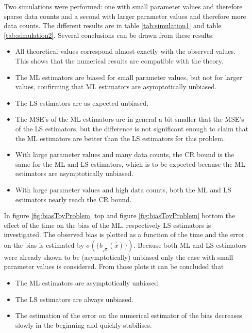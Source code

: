\documentclass[report,12pt]{report}
\begin{document}
Two simulations were performed: one with small parameter values and therefore sparse data counts and a second with larger parameter values and therefore more data counts. The different results are in table \ref{tab:simulation1} and table \ref{tab:simulation2}. Several conclusions can be drawn from these results:
\begin{itemize}
	\item All theoretical values correspond almost exactly with the observed values. This shows that the numerical results are compatible with the theory.
	
	\item The ML estimators are biased for small parameter values, but not for larger values, confirming that ML estimators are asymptotically unbiased.
	
	\item The LS estimators are as expected unbiased.
		
	\item The MSE's of the ML estimators are in general a bit smaller that the MSE's of the LS estimators, but the difference is not significant enough to claim that the ML estimators are better than the LS estimators for this problem.

	\item With large parameter values and many data counts, the CR bound is the same for the ML and LS estimators, which is to be expected because the ML estimators are asymptotically unbiased.
		
	\item With large parameter values and high data counts, both the ML and LS estimators nearly reach the CR bound.
\end{itemize}

In figure \ref{fig:biasToyProblem} top and figure \ref{fig:biasToyProblem}  bottom the effect of the time on the bias of the ML, respectively LS estimators is investigated. The observed bias is plotted as a function of the time and the error on the bias is estimated by $\sigma(\{b_{_{\sqrt{k}}}(\hat x)\})$. Because both ML and LS estimators were already shown to be (asymptotically) unbiased only the case with small parameter values is considered. From those plots it can be concluded that 
\begin{itemize}
	\item The ML estimators are asymptotically unbiased.
	
	\item The LS estimators are always unbiased.
	
	\item The estimation of the error on the numerical estimator of the bias decreases slowly in the beginning and quickly stabilises.
\end{itemize}
\end{document}
